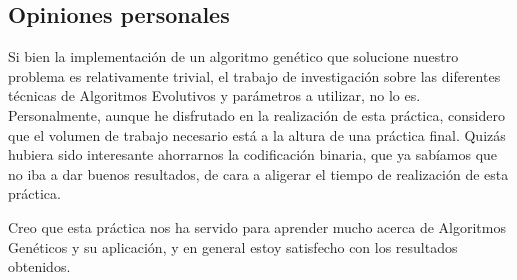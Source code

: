 \documentclass[12pt]{article}
\begin{document}
\subsection{Opiniones personales}

Si bien la implementación de un algoritmo genético que solucione nuestro problema es relativamente trivial, el trabajo de investigación sobre las diferentes técnicas de Algoritmos Evolutivos y parámetros a utilizar, no lo es. Personalmente, aunque he disfrutado en la realización de esta práctica, considero que el volumen de trabajo necesario está a la altura de una práctica final. Quizás hubiera sido interesante ahorrarnos la codificación binaria, que ya sabíamos que no iba a dar buenos resultados, de cara a aligerar el tiempo de realización de esta práctica.

Creo que esta práctica nos ha servido para aprender mucho acerca de Algoritmos Genéticos y su aplicación, y en general estoy satisfecho con los resultados obtenidos.
\end{document}
